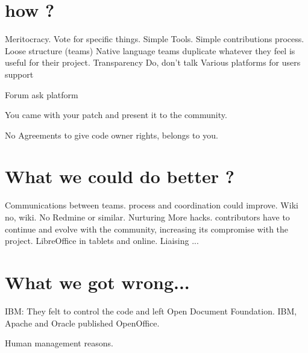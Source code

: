 \documentclass[11pt]{scrartcl}
\begin{document}

\section{how ?}
\label{sec:how}

Meritocracy.
Vote for specific things.
Simple Tools.
Simple contributions process.
Loose structure (teams)
Native language teams duplicate whatever they feel is useful for their project.
Transparency
Do, don't talk
Various platforms for users support %

Forum %
ask platform %

You came with your patch and present it to the community.

No Agreements to give code owner rights, belongs to you.


\section{What we could do better ?}
\label{sec:better}

Communications between teams. process and coordination could improve.
Wiki no, wiki.
No Redmine or similar.
Nurturing More hacks. contributors have to continue and evolve with the community, increasing its compromise with the project.
LibreOffice in tablets and online. %
Liaising ... %


\section{What we got wrong...}
\label{sec:what-wrong}

IBM: They felt to control the code and left Open Document Foundation. IBM, Apache and Oracle published OpenOffice.

Human management reasons.

\end{document}
